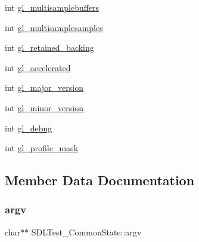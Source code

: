 \begin{DoxyCompactItemize}
\item 
int \hyperlink{struct_s_d_l_test___common_state_a083f7381809b23f0ac3a9a8de562f70c}{gl\+\_\+multisamplebuffers}
\item 
int \hyperlink{struct_s_d_l_test___common_state_a96718b47862d4962e4a7ae9a62ce4a30}{gl\+\_\+multisamplesamples}
\item 
int \hyperlink{struct_s_d_l_test___common_state_a5fa59e7aa6210fcde02940536eea9c12}{gl\+\_\+retained\+\_\+backing}
\item 
int \hyperlink{struct_s_d_l_test___common_state_a2dca523be403a9ff6fe2dd7b1808baba}{gl\+\_\+accelerated}
\item 
int \hyperlink{struct_s_d_l_test___common_state_a766e471516e0a39d0bb8c14ea2042bdf}{gl\+\_\+major\+\_\+version}
\item 
int \hyperlink{struct_s_d_l_test___common_state_a5a50c65004454c791da21a3473388608}{gl\+\_\+minor\+\_\+version}
\item 
int \hyperlink{struct_s_d_l_test___common_state_a2710657ef2a0c8aabebc5fceb01c71b5}{gl\+\_\+debug}
\item 
int \hyperlink{struct_s_d_l_test___common_state_aa923ff5f227c35523a4e491863a7d907}{gl\+\_\+profile\+\_\+mask}
\end{DoxyCompactItemize}


\subsection{Member Data Documentation}
\mbox{\label{struct_s_d_l_test___common_state_a6db840410b86ab7c6807763fd8bcb081}} 
\subsubsection{\texorpdfstring{argv}{argv}}
{\footnotesize\ttfamily char$\ast$$\ast$ S\+D\+L\+Test\+\_\+\+Common\+State\+::argv}

\mbox{\label{struct_s_d_l_test___common_state_ae51671cdec7979ca844f19b650b75300}} 

